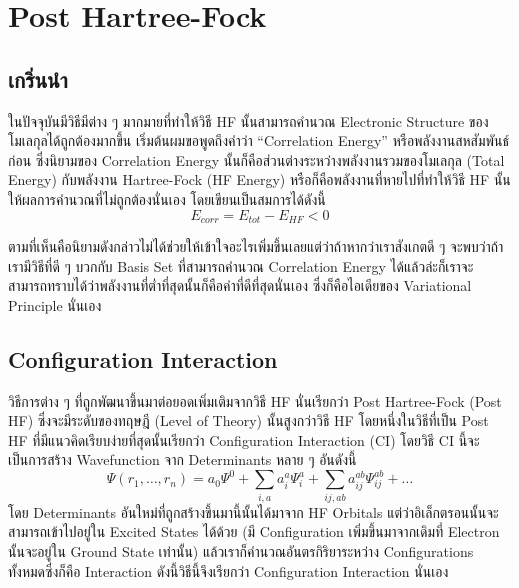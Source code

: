 
\chapter{Post Hartree-Fock}

\section{เกริ่นนำ}

ในปัจจุบันมีวิธีมีต่าง ๆ มากมายที่ทำให้วิธี HF นั้นสามารถคำนวณ Electronic Structure ของโมเลกุลได้ถูกต้องมากขึ้น เริ่มต้นผมขอพูดถึงคำว่า \enquote{Correlation Energy} หรือพลังงานสหสัมพันธ์ก่อน ซึ่งนิยามของ Correlation Energy นั้นก็คือส่วนต่างระหว่างพลังงานรวมของโมเลกุล (Total Energy) กับพลังงาน Hartree-Fock (HF Energy) หรือก็คือพลังงานที่หายไปที่ทำให้วิธี HF นั้นให้ผลการคำนวณที่ไม่ถูกต้องนั่นเอง โดยเขียนเป็นสมการได้ดังนี้
%
\begin{equation}
    E_{corr} = E_{tot} - E_{HF} < 0
\end{equation}

ตามที่เห็นคือนิยามดังกล่าวไม่ได้ช่วยให้เข้าใจอะไรเพิ่มขึ้นเลยแต่ว่าถ้าหากว่าเราสังเกตดี ๆ จะพบว่าถ้าเรามีวิธีที่ดี ๆ บวกกับ Basis Set ที่สามารถคำนวณ Correlation Energy ได้แล้วล่ะก็เราจะสามารถทราบได้ว่าพลังงานที่ต่ำที่สุดนั้นก็คือค่าที่ดีที่สุดนั่นเอง ซึ่งก็คือไอเดียของ Variational Principle นั่นเอง

\section{Configuration Interaction}

วิธีการต่าง ๆ ที่ถูกพัฒนาขึ้นมาต่อยอดเพิ่มเติมจากวิธี HF นั่นเรียกว่า Post Hartree-Fock (Post HF) ซึ่งจะมีระดับของทฤษฎี (Level of Theory) นั้นสูงกว่าวิธี HF โดยหนึ่งในวิธีที่เป็น Post HF ที่มีแนวคิดเรียบง่ายที่สุดนั้นเรียกว่า Configuration Interaction (CI) โดยวิธี CI นี้จะเป็นการสร้าง Wavefunction จาก Determinants หลาย ๆ อันดังนี้
%
\begin{equation}
    \Psi(r_{1}, \dots, r_{n})
    =
    a_{0} \Psi^{0}
    + \sum_{i,a} a^{a}_{i} \Psi^{a}_{i}
    + \sum_{ij,ab} a^{ab}_{ij} \Psi^{ab}_{ij}
    + \dots
\end{equation}
%
โดย Determinants อันใหม่ที่ถูกสร้างขึ้นมานี้นั้นได้มาจาก HF Orbitals แต่ว่าอิเล็กตรอนนั้นจะสามารถเข้าไปอยู่ใน Excited States ได้ด้วย (มี Configuration เพิ่มขึ้นมาจากเดิมที่ Electron นั้นจะอยู่ใน Ground State เท่านั้น) แล้วเราก็คำนวณอันตรกิริยาระหว่าง Configurations ทั้งหมดซึ่งก็คือ Interaction ดังนี้วิธีนี้จึงเรียกว่า Configuration Interaction นั่นเอง

